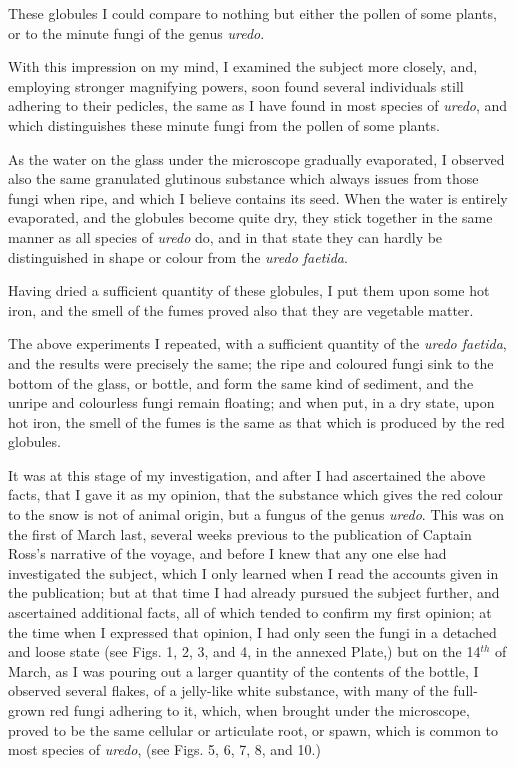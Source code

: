 \documentclass[a4paper, 12pt, oneside]{article}
\begin{document}
These globules I could compare to nothing but either the pollen of some plants, or to the minute fungi of the genus \emph{uredo}.

With this impression on my mind, I examined the subject more closely, and, employing stronger magnifying powers, soon found several individuals still adhering to their pedicles, the same as I have found in most species of \emph{uredo}, and which distinguishes these minute fungi from the pollen of some plants.

As the water on the glass under the microscope gradually evaporated, I observed also the same granulated glutinous substance which always issues from those fungi when ripe, and which I believe contains its seed. When the water is entirely evaporated, and the globules become quite dry, they stick together in the same manner as all species of \emph{uredo} do, and in that state they can hardly be distinguished in shape or colour from the \emph{uredo faetida}.

Having dried a sufficient quantity of these globules, I put them upon some hot iron, and the smell of the fumes proved also that they are vegetable matter.

The above experiments I repeated, with a sufficient quantity of the \emph{uredo faetida}, and the results were precisely the same; the ripe and coloured fungi sink to the bottom of the glass, or bottle, and form the same kind of sediment, and the unripe and colourless fungi remain floating; and when put, in a dry state, upon hot iron, the smell of the fumes is the same as that which is produced by the red globules.

It was at this stage of my investigation, and after I had ascertained the above facts, that I gave it as my opinion, that the substance which gives the red colour to the snow is not of animal origin, but a fungus of the genus \emph{uredo}. This was on the first of March last, several weeks previous to the publication of Captain Ross's narrative of the voyage, and before I knew that any one else had investigated the subject, which I only learned when I read the accounts given in the publication; but at that time I had already pursued the subject further, and ascertained additional facts, all of which tended to confirm my first opinion; at the time when I expressed that opinion, I had only seen the fungi in a detached and loose state (see Figs. 1, 2, 3, and 4, in the annexed Plate,) but on the 14$^{th}$ of March, as I was pouring out a larger quantity of the contents of the bottle, I observed several flakes, of a jelly-like white substance, with many of the full-grown red fungi adhering to it, which, when brought under the microscope, proved to be the same cellular or articulate root, or spawn, which is common to most species of \emph{uredo}, (see Figs. 5, 6, 7, 8, and 10.)
\end{document}
